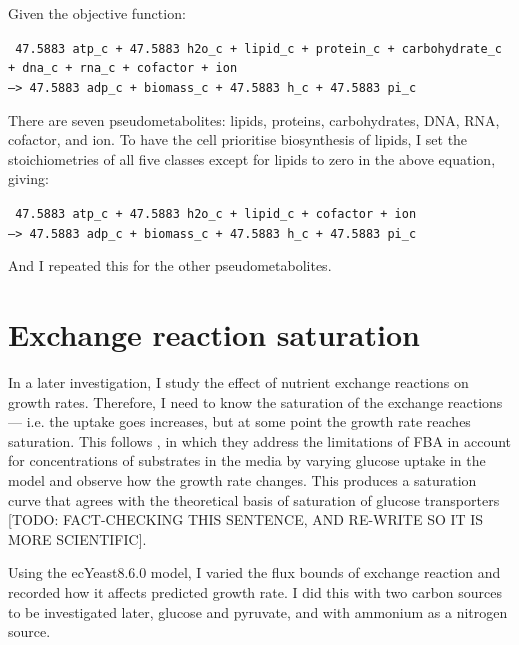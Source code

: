 Given the objective function:

\texttt{
  47.5883 atp\_c + 47.5883 h2o\_c + lipid\_c + protein\_c + carbohydrate\_c\\
  + dna\_c + rna\_c + cofactor + ion \\
  --> 47.5883 adp\_c + biomass\_c + 47.5883 h\_c + 47.5883 pi\_c
}

There are seven pseudometabolites: lipids, proteins, carbohydrates, DNA, RNA, cofactor, and ion.
To have the cell prioritise biosynthesis of lipids, I set the stoichiometries of all five classes except for lipids to zero in the above equation, giving:

\texttt{
  47.5883 atp\_c + 47.5883 h2o\_c + lipid\_c + cofactor + ion \\
  --> 47.5883 adp\_c + biomass\_c + 47.5883 h\_c + 47.5883 pi\_c
}

And I repeated this for the other pseudometabolites.

\section{Exchange reaction saturation}
\label{sec:model-saturation}

In a later investigation, I study the effect of nutrient exchange reactions on growth rates.
Therefore, I need to know the saturation of the exchange reactions --- i.e. the uptake goes increases, but at some point the growth rate reaches saturation.
This follows \textcite{elsemmanWholecellModelingYeast2022}, in which they address the limitations of FBA in account for concentrations of substrates in the media by varying glucose uptake in the model and observe how the growth rate changes.
This produces a saturation curve that agrees with the theoretical basis of saturation of glucose transporters [TODO: FACT-CHECKING THIS SENTENCE, AND RE-WRITE SO IT IS MORE SCIENTIFIC].

Using the ecYeast8.6.0 model, I varied the flux bounds of exchange reaction and recorded how it affects predicted growth rate.
I did this with two carbon sources to be investigated later, glucose and pyruvate, and with ammonium as a nitrogen source.

